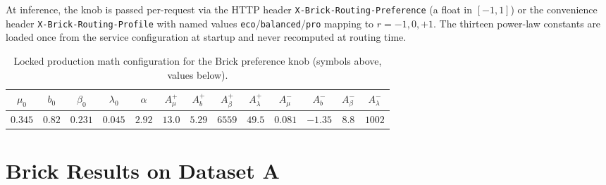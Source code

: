 \documentclass[twocolumn,10pt,a4paper]{article}
\begin{document}
At inference, the knob is passed per-request via the HTTP header \texttt{X-Brick-Routing-Preference} (a float in $[-1,1]$) or the convenience header \texttt{X-Brick-Routing-Profile} with named values \texttt{eco}/\texttt{balanced}/\texttt{pro} mapping to $r{=}{-1},0,{+1}$. The thirteen power-law constants are loaded once from the service configuration at startup and never recomputed at routing time.

\begin{table}[!t]
\centering
\caption{Locked production math configuration for the Brick preference knob (symbols above, values below).}
\label{tab:brick-knob-defaults}
\small
\setlength{\tabcolsep}{5pt}
\begin{tabular}{*{13}{c}}
\toprule
$\mu_0$ & $b_0$ & $\beta_0$ & $\lambda_0$ & $\alpha$ &
$A_{\mu}^{+}$ & $A_b^{+}$ & $A_{\beta}^{+}$ & $A_{\lambda}^{+}$ &
$A_{\mu}^{-}$ & $A_b^{-}$ & $A_{\beta}^{-}$ & $A_{\lambda}^{-}$ \\
\midrule
$0.345$ & $0.82$ & $0.231$ & $0.045$ & $2.92$ &
$13.0$ & $5.29$ & $6559$ & $49.5$ &
$0.081$ & $-1.35$ & $8.8$ & $1002$ \\
\bottomrule
\end{tabular}
\end{table}

\section{Brick Results on Dataset A}\label{sec:results}
\end{document}
